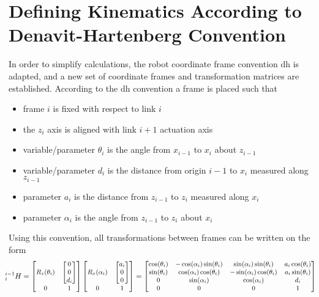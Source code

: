 \section{Defining Kinematics According to Denavit-Hartenberg Convention}
\vspace{-2mm}
In order to simplify calculations, the robot coordinate frame convention \gls{dh} is adapted, and a new set of coordinate frames and transformation matrices are established. According to the \gls{dh} convention a frame is placed such that
\begin{itemize}
\itemsep-1.3mm 
\item frame $i$ is fixed with respect to link $i$
\item the $z_i$ axis is aligned with link $i+1$ actuation axis
\item variable/parameter $\theta_i$ is the angle from $x_{i-1}$ to $x_i$ about $z_{i-1}$
\item variable/parameter $d_i$ is the distance from origin $i-1$ to $x_i$ measured along $z_{i-1}$
\item parameter $a_i$ is the distance from $z_{i-1}$ to $z_i$ measured along $x_i$
\item parameter $\alpha_i$ is the angle from $z_{i-1}$ to $z_i$ about $x_i$
\end{itemize}

Using this convention, all transformations between frames can be written on the form
\begin{equation}
\hspace*{-2mm}
\small
^{i-1}_i H = %
\begin{bmatrix}
R_z(\theta_i) & \begin{bmatrix}0\\ 0\\ d_i\end{bmatrix}\\
0 & 1
\end{bmatrix}
\begin{bmatrix}
R_x(\alpha_i) & \begin{bmatrix}a_i\\ 0\\ 0\end{bmatrix}\\
0 & 1
\end{bmatrix}
=
\begin{bmatrix}
\cos(\theta_i) & -\cos(\alpha_i)\sin(\theta_i) & \sin(\alpha_i)\sin(\theta_i) & a_i \cos(\theta_i)\\
\sin(\theta_i) & \cos(\alpha_i)\cos(\theta_i) & -\sin(\alpha_i)\cos(\theta_i) & a_i \sin(\theta_i)\\
0 & \sin(\alpha_i) & \cos(\alpha_i) & d_i\\
0 & 0 & 0 & 1
\end{bmatrix}
\end{equation}

